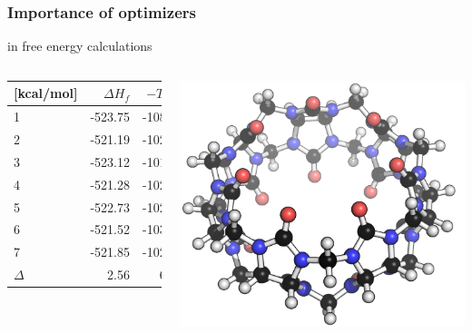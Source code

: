 \begin{frame}[fragile]
    \frametitle{Importance of optimizers}

    \begin{center}
        in free energy calculations

    \end{center}

    \begin{columns}[t]

        \centering

        \begin{tabular}{@{} l r r r @{} }

            [kcal/mol] & $\Delta H_f$ & $-T\Delta S$ & $N_i$ \\

          \midrule

          1 & -523.75 & -108.18 & 21 \\
          2 & -521.19 & -102.25 & 4 \\
          3 & -523.12 & -101.34 & 4 \\
          4 & -521.28 & -102.40 & 4 \\
          5 & -522.73 & -102.15 & 6 \\
          6 & -521.52 & -103.26 & 7 \\
          7 & -521.85 & -102.86 & 7 \\

          \midrule

          $\Delta$ & 2.56 & 6.84

        \end{tabular}


        \centering
 
        \includegraphics[width=0.9\linewidth]{images/cb7-a.png}


\end{columns}
\end{frame}
